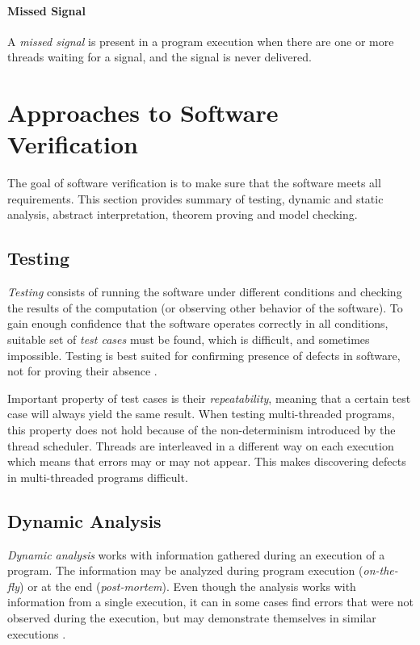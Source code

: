 \paragraph{Missed Signal}
A \emph{missed signal} is present in a program execution when there are one or
more threads waiting for a signal, and the signal is never delivered.

\section{Approaches to Software Verification}
\label{approachesToSwVerification}


The goal of software verification is to make sure that the software meets all
requirements. This section provides summary of testing, dynamic and static
analysis, abstract interpretation, theorem proving and model checking.

\subsection{Testing}

\emph{Testing} consists of running the software under different conditions and
checking the results of the computation (or observing other behavior of the
software). To gain enough confidence that the software operates correctly in all
conditions, suitable set of \emph{test cases} must be found, which is difficult,
and sometimes impossible. Testing is best suited for confirming presence of
defects in software, not for proving their absence \cite{fundamentals}.

Important property of test cases is their \emph{repeatability}, meaning that a
certain test case will always yield the same result. When testing multi-threaded
programs, this property does not hold because of the non-determinism introduced
by the thread scheduler. Threads are interleaved in a different way on each
execution which means that errors may or may not appear. This makes discovering
defects in multi-threaded programs difficult.

\subsection{Dynamic Analysis}

\emph{Dynamic analysis} works with information gathered during an execution of a
program. The information may be analyzed during program execution
(\emph{on-the-fly}) or at the end (\emph{post-mortem}). Even though the analysis
works with information from a single execution, it can in some cases find errors
that were not observed during the execution, but may demonstrate themselves in
similar executions \cite{letko}.

